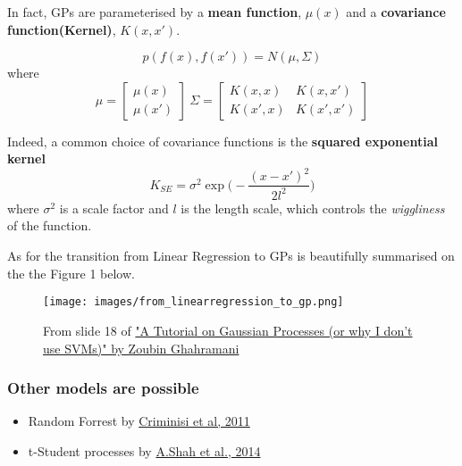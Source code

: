 \documentclass{article}
\theoremstyle{definition}
\begin{document}
In fact, GPs are parameterised by a \textbf{mean function}, $\mu(x)$ and a \textbf{covariance function(Kernel)}, $K(x, x')$.

\[ p(f(x), f(x')) = N(\mu, \Sigma) \]
where
\[
\mu = 
\begin{bmatrix}
\mu(x)\\
\mu(x')
\end{bmatrix}
\ 
\Sigma = 
\begin{bmatrix}
K(x, x) & K(x, x') \\
K(x', x) & K(x', x')
\end{bmatrix}
\]

Indeed, a common choice of covariance functions is the \textbf{squared exponential kernel}
\[ K_{SE} = \sigma^2 \exp{ \Big( - \frac{(x - x')^2}{2l^2} \Big) } \]
where $\sigma^2$ is a scale factor and $l$ is the length scale, which controls the \textit{wiggliness} of the function.

As for the transition from Linear Regression to GPs is beautifully summarised on the the Figure 1 below.

\begin{figure}[h]
\caption{From slide 18 of  \href{http://mlss2011.comp.nus.edu.sg/uploads/Site/lect1gp.pdf}{ "A Tutorial on Gaussian Processes (or why I don’t use SVMs)" by Zoubin Ghahramani}}
\centering
\texttt{[image: images/from\_linearregression\_to\_gp.png]}
\end{figure}

\subsubsection{Other models are possible}
\begin{itemize}
    \item Random Forrest by \href{https://www.microsoft.com/en-us/research/wp-content/uploads/2016/02/decisionForests_MSR_TR_2011_114.pdf}{Criminisi et al, 2011}
    \item t-Student processes by \href{https://www.cs.cmu.edu/~andrewgw/tprocess.pdf}{A.Shah et al., 2014}
\end{itemize}
\end{document}
